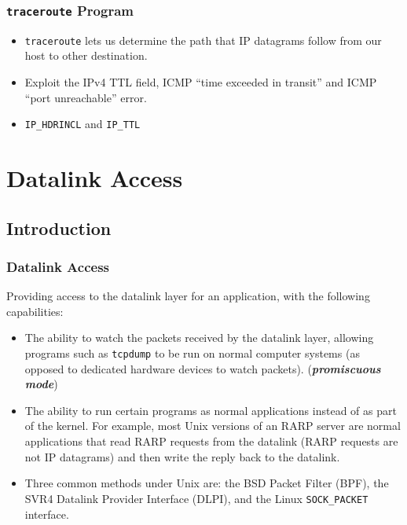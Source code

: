 \documentclass[notes,serif]{beamer}
\begin{document}
\begin{frame}
\frametitle{\texttt{traceroute} Program}
\begin{itemize}
  \item \texttt{traceroute} lets us determine the path that IP datagrams follow from our host to other destination.
  \item Exploit the IPv4 TTL field, ICMP ``time exceeded in transit'' and ICMP ``port unreachable'' error.
  \item \texttt{IP\_HDRINCL} and \texttt{IP\_TTL}
\end{itemize}
\end{frame}

\section{Datalink Access}
\subsection{Introduction}
\begin{frame}
\frametitle{Datalink Access}
Providing access to the datalink layer for an application, with the following capabilities:
\begin{itemize}
  \item The ability to watch the packets received by the datalink layer, allowing programs such as \texttt{tcpdump} to be run on normal computer systems (as opposed to dedicated hardware devices to watch packets). (\textbf{\textit{promiscuous mode}})
  \item The ability to run certain programs as normal applications instead of as part of the kernel. For example, most Unix versions of an RARP server are normal applications that read RARP requests from the datalink (RARP requests are not IP datagrams) and then write the reply back to the datalink.
  \item Three common methods under Unix are: the BSD Packet Filter (BPF), the SVR4 Datalink Provider Interface (DLPI), and the Linux \texttt{SOCK\_PACKET} interface.
\end{itemize}
\end{frame}
\end{document}
